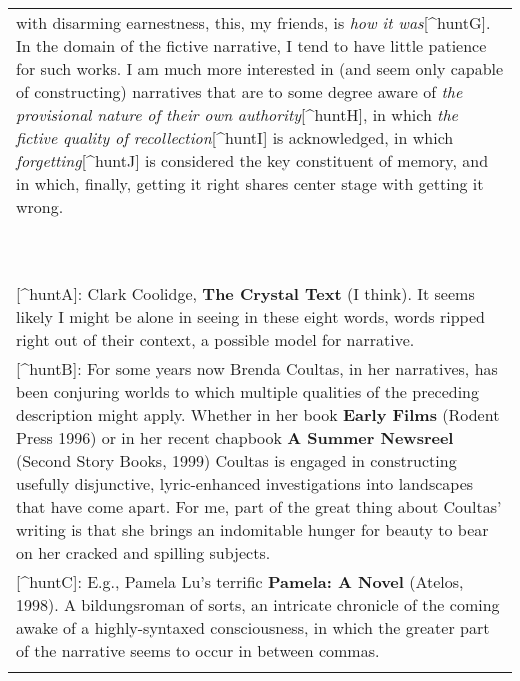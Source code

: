 \begin{longtable}[]{@{}l@{}}
\begin{minipage}[t]{0.97\columnwidth}
with disarming earnestness, this, my friends, is \emph{how it
was}{[}\^{}huntG{]}. In the domain of the fictive narrative, I tend to
have little patience for such works. I am much more interested in (and
seem only capable of constructing) narratives that are to some degree
aware of \emph{the provisional nature of their own
authority}{[}\^{}huntH{]}, in which \emph{the fictive quality of
recollection}{[}\^{}huntI{]} is acknowledged, in which
\emph{forgetting}{[}\^{}huntJ{]} is considered the key constituent of
memory, and in which, finally, getting it right shares center stage with
getting it wrong.\strut
\end{minipage}\tabularnewline
\begin{minipage}[t]{0.97\columnwidth}\raggedright
~\strut
\end{minipage}\tabularnewline
\begin{minipage}[t]{0.97\columnwidth}\raggedright
~\strut
\end{minipage}\tabularnewline
\begin{minipage}[t]{0.97\columnwidth}\raggedright
{[}\^{}huntA{]}: Clark Coolidge, \textbf{The Crystal Text} (I think). It
seems likely I might be alone in seeing in these eight words, words
ripped right out of their context, a possible model for narrative.\strut
\end{minipage}\tabularnewline
\begin{minipage}[t]{0.97\columnwidth}\raggedright
{[}\^{}huntB{]}: For some years now Brenda Coultas, in her narratives,
has been conjuring worlds to which multiple qualities of the preceding
description might apply. Whether in her book \textbf{Early Films}
(Rodent Press 1996) or in her recent chapbook \textbf{A Summer Newsreel}
(Second Story Books, 1999) Coultas is engaged in constructing usefully
disjunctive, lyric-enhanced investigations into landscapes that have
come apart. For me, part of the great thing about Coultas' writing is
that she brings an indomitable hunger for beauty to bear on her cracked
and spilling subjects.\strut
\end{minipage}\tabularnewline
\begin{minipage}[t]{0.97\columnwidth}\raggedright
{[}\^{}huntC{]}: E.g., Pamela Lu's terrific \textbf{Pamela: A Novel}
(Atelos, 1998). A bildungsroman of sorts, an intricate chronicle of the
coming awake of a highly-syntaxed consciousness, in which the greater
part of the narrative seems to occur in between commas.\strut
\end{minipage}\tabularnewline
\begin{minipage}[t]{0.97\columnwidth}\raggedright

\end{minipage}
\end{longtable}
